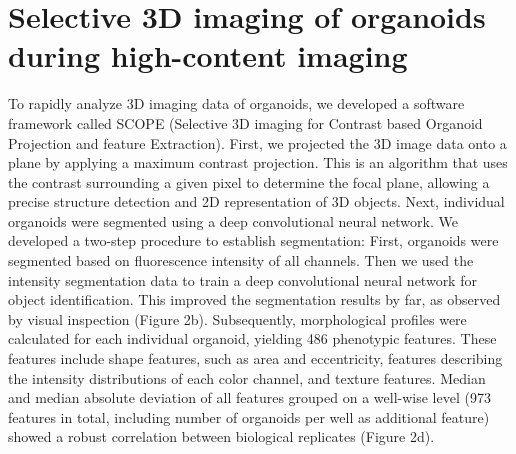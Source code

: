\section{Selective 3D imaging of organoids during high-content imaging}
To rapidly analyze 3D imaging data of organoids, we developed a software framework called SCOPE (Selective 3D imaging for Contrast based Organoid Projection and feature Extraction). 
First, we projected the 3D image data onto a plane by applying a maximum contrast projection. 
This is an algorithm that uses the contrast surrounding a given pixel to determine the focal plane, allowing a precise structure detection and 2D representation of 3D objects. 
Next, individual organoids were segmented using a deep convolutional neural network. We developed a two-step procedure to establish segmentation: First, organoids were segmented based on fluorescence intensity of all channels. 
Then we used the intensity segmentation data to train a deep convolutional neural network for object identification. 
This improved the segmentation results by far, as observed by visual inspection (Figure 2b).
Subsequently, morphological profiles were calculated for each individual organoid, yielding 486 phenotypic features. 
These features include shape features, such as area and eccentricity, features describing the intensity distributions of each color channel, and texture features. 
Median and median absolute deviation of all features grouped on a well-wise level (973 features in total, including number of organoids per well as additional feature) showed a robust correlation between biological replicates (Figure 2d).
